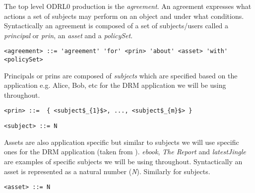 
The top level ODRL0 production is the \emph{agreement}. An agreement expresses what actions a set of subjects may perform on an object and under what conditions. Syntactically an agreement is composed of a set of subjects/users called a \emph{principal} or \emph{prin}, an \emph{asset} and a \emph{policySet}.

\lstset{language=AST}
\begin{lstlisting}[frame=single, caption={agreement},label={lst:agreementast}]
<agreement> ::= 'agreement' 'for' <prin> 'about' <asset> 'with' <policySet> 
\end{lstlisting}

Principals or prins are composed of \emph{subjects} which are specified based on the application e.g. Alice, Bob, etc for the DRM application we will be using throughout.

\lstset{mathescape, language=AST}  
\begin{lstlisting}[frame=single, caption={prin},label={lst:prinast}]
<prin> ::=  { <subject$_{1}$>, ..., <subject$_{m}$> }
\end{lstlisting}

\lstset{mathescape, language=AST}  
\begin{lstlisting}[frame=single, caption={subject},label={lst:subjectast}]
<subject> ::= N
\end{lstlisting}

Assets are also application specific but similar to subjects we will use specific ones for the DRM application (taken from \cite{pucella2006}). \emph{ebook}, \emph{The Report} and \emph{latestJingle} are examples of specific subjects we will be using throughout. Syntactically an asset is represented as a natural number (\emph{N}). Similarly for subjects.

\lstset{mathescape, language=AST}  
\begin{lstlisting}[frame=single, caption={asset},label={lst:assetast}]
<asset> ::= N
\end{lstlisting}

